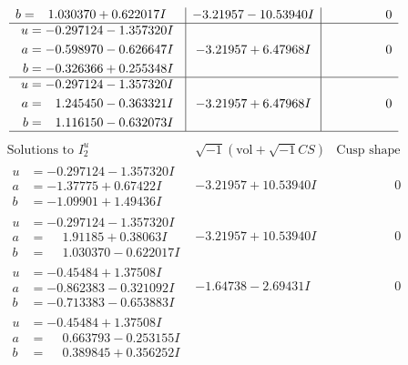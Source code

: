 \documentclass[1p]{elsarticle_modified}
\theoremstyle{definition}
\newcommand{\I}{\sqrt{-1}}
\begin{document}
$$\begin{array}{c|c|c}
\begin{aligned}
b &= \phantom{-}1.030370 + 0.622017 I\end{aligned}
 & -3.21957 - 10.53940 I & \phantom{-0.000000 } 0 \\ \hline\begin{aligned}
u &= -0.297124 - 1.357320 I \\
a &= -0.598970 - 0.626647 I \\
b &= -0.326366 + 0.255348 I\end{aligned}
 & -3.21957 + 6.47968 I & \phantom{-0.000000 } 0 \\ \hline\begin{aligned}
u &= -0.297124 - 1.357320 I \\
a &= \phantom{-}1.245450 - 0.363321 I \\
b &= \phantom{-}1.116150 - 0.632073 I\end{aligned}
 & -3.21957 + 6.47968 I & \phantom{-0.000000 } 0\\
 \hline 
 \end{array}$$\newpage$$\begin{array}{c|c|c}  
\text{Solutions to }I^u_{2}& \I (\text{vol} + \sqrt{-1}CS) & \text{Cusp shape}\\
 \hline 
\begin{aligned}
u &= -0.297124 - 1.357320 I \\
a &= -1.37775 + 0.67422 I \\
b &= -1.09901 + 1.49436 I\end{aligned}
 & -3.21957 + 10.53940 I & \phantom{-0.000000 } 0 \\ \hline\begin{aligned}
u &= -0.297124 - 1.357320 I \\
a &= \phantom{-}1.91185 + 0.38063 I \\
b &= \phantom{-}1.030370 - 0.622017 I\end{aligned}
 & -3.21957 + 10.53940 I & \phantom{-0.000000 } 0 \\ \hline\begin{aligned}
u &= -0.45484 + 1.37508 I \\
a &= -0.862383 - 0.321092 I \\
b &= -0.713383 - 0.653883 I\end{aligned}
 & -1.64738 - 2.69431 I & \phantom{-0.000000 } 0 \\ \hline\begin{aligned}
u &= -0.45484 + 1.37508 I \\
a &= \phantom{-}0.663793 - 0.253155 I \\
b &= \phantom{-}0.389845 + 0.356252 I\end{aligned}

\end{array}$$
\end{document}
